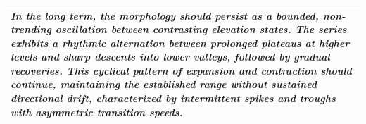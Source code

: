 \documentclass[11pt]{article}
\begin{document}
\begin{table}[t]
\begin{tabular}{p{}}
{{\textit{In the long term, the morphology should persist as a bounded,
non-trending oscillation between contrasting elevation states. The series
exhibits a rhythmic alternation between prolonged plateaus at higher levels and
sharp descents into lower valleys, followed by gradual recoveries. This
cyclical pattern of expansion and contraction should continue, maintaining the
established range without sustained directional drift, characterized by
intermittent spikes and troughs with asymmetric transition speeds.}
}} \\

\bottomrule
\end{tabular}
\end{table}
\end{document}
